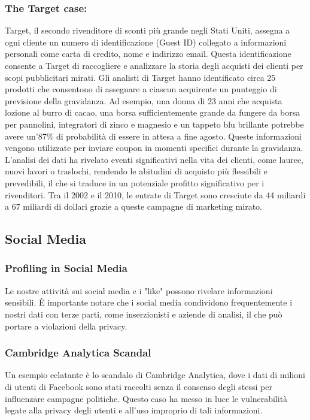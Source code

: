 \documentclass{report}
\begin{document}
\subsubsection{The Target case:} 
Target, il secondo rivenditore di sconti più grande negli Stati Uniti, assegna a ogni cliente un numero di identificazione (Guest ID) collegato a informazioni personali come carta di credito, nome e indirizzo email. Questa identificazione consente a Target di raccogliere e analizzare la storia degli acquisti dei clienti per scopi pubblicitari mirati. 
Gli analisti di Target hanno identificato circa 25 prodotti che consentono di assegnare a ciascun acquirente un punteggio di previsione della gravidanza. Ad esempio, una donna di 23 anni che acquista lozione al burro di cacao, una borsa sufficientemente grande da fungere da borsa per pannolini, integratori di zinco e magnesio e un tappeto blu brillante potrebbe avere un'87\% di probabilità di essere in attesa a fine agosto. Queste informazioni vengono utilizzate per inviare coupon in momenti specifici durante la gravidanza. 
L'analisi dei dati ha rivelato eventi significativi nella vita dei clienti, come lauree, nuovi lavori o traslochi, rendendo le abitudini di acquisto più flessibili e prevedibili, il che si traduce in un potenziale profitto significativo per i rivenditori. Tra il 2002 e il 2010, le entrate di Target sono cresciute da 44 miliardi a 67 miliardi di dollari grazie a queste campagne di marketing mirato.


\subsection{Social Media}

\subsubsection{Profiling in Social Media}
Le nostre attività sui social media e i "like" possono rivelare informazioni sensibili. 
È importante notare che i social media condividono frequentemente i nostri dati con terze parti, come inserzionisti e aziende di analisi, il che può portare a violazioni della privacy.

\subsubsection{Cambridge Analytica Scandal}
Un esempio eclatante è lo scandalo di Cambridge Analytica, dove i dati di milioni di utenti di Facebook sono stati raccolti senza il consenso degli stessi per influenzare campagne politiche. 
Questo caso ha messo in luce le vulnerabilità legate alla privacy degli utenti e all'uso improprio di tali informazioni.
\end{document}
